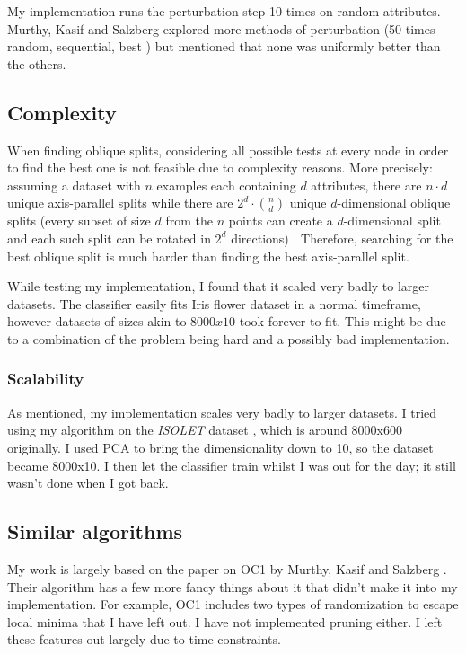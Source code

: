 \documentclass[12pt]{article}
\begin{document}
My implementation runs the perturbation step 10 times on random attributes. Murthy, Kasif and Salzberg explored more methods of perturbation (50 times random, sequential, best \cite{KSM:1994}) but mentioned that none was uniformly better than the others.

\subsection{Complexity}
When finding oblique splits, considering all possible tests at every node in order to find the best one is not feasible due to complexity reasons. More precisely: assuming a dataset with $n$ examples each containing $d$ attributes, there are $n \cdot d$ unique axis-parallel splits while there are $2^d \cdot {n \choose d}$ unique $d$-dimensional oblique splits (every subset of size $d$ from the $n$ points can create a $d$-dimensional split and each such split can be rotated in $2^d$ directions) \cite{KSM:1994}. Therefore, searching for the best oblique split is much harder than finding the best axis-parallel split.

While testing my implementation, I found that it scaled very badly to larger datasets. The classifier easily fits Iris flower dataset in a normal timeframe, however datasets of sizes akin to $8000x10$ took forever to fit. This might be due to a combination of the problem being hard and a possibly bad implementation.

\subsubsection{Scalability}
As mentioned, my implementation scales very badly to larger datasets. I tried using my algorithm on the \emph{ISOLET} dataset \cite{Bache+Lichman:2013}, which is around 8000x600 originally. I used PCA to bring the dimensionality down to 10, so the dataset became 8000x10. I then let the classifier train whilst I was out for the day; it still wasn't done when I got back.

\subsection{Similar algorithms}
My work is largely based on the paper on OC1 by Murthy, Kasif and Salzberg \cite{KSM:1994}. Their algorithm has a few more fancy things about it that didn't make it into my implementation. For example, OC1 includes two types of randomization to escape local minima that I have left out. I have not implemented pruning either. I left these features out largely due to time constraints.
\end{document}
